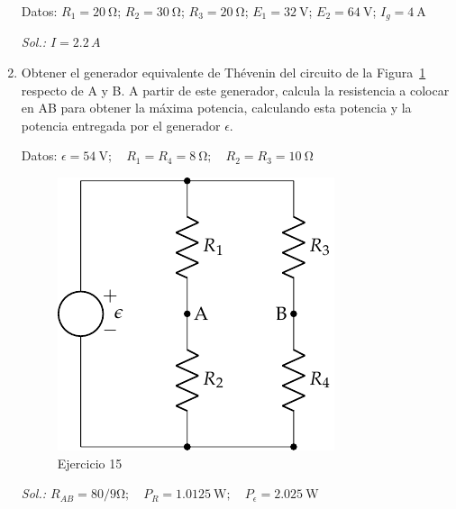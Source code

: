 \begin{enumerate}
  Datos: $R_1 = \qty{20}{\ohm}$; $R_2 = \qty{30}{\ohm}$; $R_3 = \qty{20}{\ohm}$; $E_1 = \qty{32}{\volt}$; $E_2 = \qty{64}{\volt}$; $I_g = \qty{4}{\ampere}$

  \emph{Sol.: $I=2.2\,A$}

\item Obtener el generador equivalente de Thévenin del circuito de la
  Figura~\ref{fig.ejTheveninRAB_BT1} respecto de A y B. A partir de
  este generador, calcula la resistencia a colocar en AB para obtener
  la máxima potencia, calculando esta potencia y la potencia entregada
  por el generador $\epsilon$.

  Datos:
  $\epsilon = \qty{54}{\volt};\quad R_1 = R_4 = \qty{8}{\ohm};\quad
  R_2 = R_3 = \qty{10}{\ohm}$

    \begin{figure}[H]
      \centering \includegraphics{../figs/Thevenin2}
      \caption{Ejercicio 15}
      \label{fig.ejTheveninRAB_BT1}
    \end{figure}

    \emph{Sol.:
      $R_{AB} = 80/9\si{\ohm}; \quad P_R = \qty{1.0125}{\watt}; \quad
      P_\epsilon = \qty{2.025}{\watt}$}


\end{enumerate}
